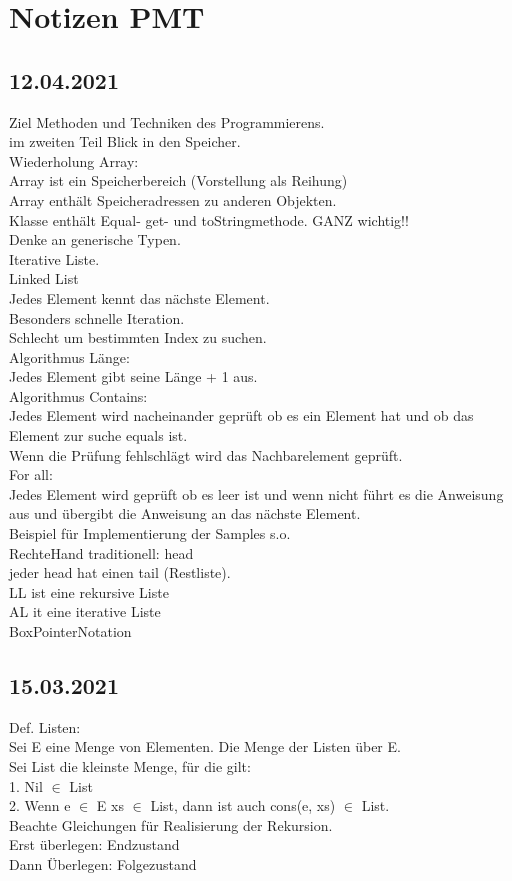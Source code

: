 \documentclass[paper=A4]{article}
\begin{document}
	\section*{Notizen PMT}
	\subsection*{12.04.2021}
	Ziel Methoden und Techniken des Programmierens. \\
	im zweiten Teil Blick in den Speicher. \\
	Wiederholung Array: \\
	Array ist ein Speicherbereich (Vorstellung als Reihung) \\
	Array enthält Speicheradressen zu anderen Objekten. \\
	Klasse enthält Equal- get- und toStringmethode. GANZ wichtig!! \\
	Denke an generische Typen. \\
	Iterative Liste. \\
	Linked List \\
	Jedes Element kennt das nächste Element. \\
	Besonders schnelle Iteration. \\
	Schlecht um bestimmten Index zu suchen. \\
	Algorithmus Länge: \\
	Jedes Element gibt seine Länge + 1 aus. \\
	Algorithmus Contains: \\
	Jedes Element wird nacheinander geprüft ob es ein Element hat und ob das Element zur suche equals ist. \\
	Wenn die Prüfung fehlschlägt wird das Nachbarelement geprüft. \\
	For all: \\
	Jedes Element wird geprüft ob es leer ist und wenn nicht führt es die Anweisung aus und übergibt die Anweisung an das nächste Element. \\
	Beispiel für Implementierung der Samples s.o. \\
	RechteHand traditionell: head \\
	jeder head hat einen tail (Restliste). \\
	LL ist eine rekursive Liste \\
	AL it eine iterative Liste \\
	BoxPointerNotation \\
	\subsection*{15.03.2021}
	Def. Listen: \\
	Sei E eine Menge von Elementen. Die Menge der Listen über E. \\
	Sei List die kleinste Menge, für die gilt: \\
	1. Nil $\in$ List \\
	2. Wenn e $\in$ E xs $\in$ List, dann ist auch cons(e, xs) $\in$ List. \\
	Beachte Gleichungen für Realisierung der Rekursion. \\
	Erst überlegen: Endzustand \\
	Dann Überlegen: Folgezustand
\end{document}
